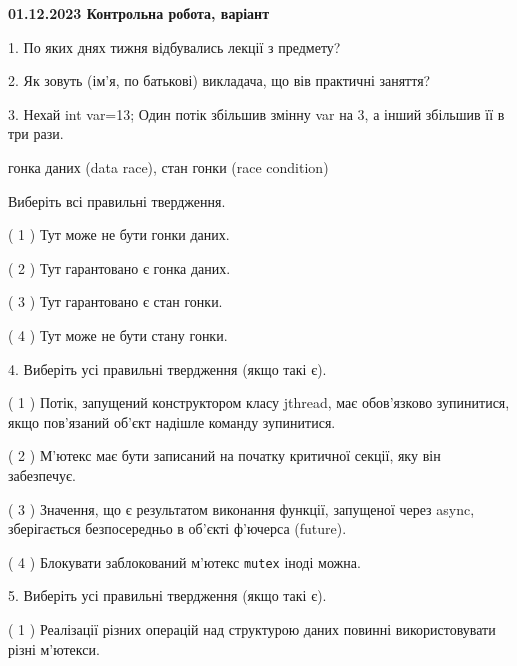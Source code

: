 \documentclass[12pt, ukrainian]{article}
\def\code#1{\Verb!#1!}
\begin{document}
\begin {large}

\textbf{01.12.2023 Контрольна робота, варіант  }\par


{
1. По яких днях тижня відбувались лекції з предмету?



\vspace{5mm}
2. Як зовуть (ім'я, по батькові) викладача, що вів практичні заняття?



\vspace{5mm}
3. Нехай int var=13; Один потік збільшив змінну var на 3, а інший збільшив її в три рази.

гонка даних (data race), стан гонки (race condition)

Виберіть всі правильні твердження.\par
\vspace{2mm}
( 1 ) Тут може не бути гонки даних.%

( 2 ) Тут гарантовано є гонка даних.%

( 3 ) Тут гарантовано є стан гонки.%

( 4 ) Тут може не бути стану гонки.%


\vspace{5mm}
4. Виберіть усі правильні твердження (якщо такі є).\par
\vspace{2mm}

( 1 ) Потік, запущений конструктором класу jthread, має обов’язково зупинитися, якщо пов’язаний об’єкт надішле команду зупинитися.%

( 2 ) М’ютекс має бути записаний на початку критичної секції, яку він забезпечує.%

( 3 ) Значення, що є результатом виконання функції, запущеної через async, зберігається безпосередньо в об’єкті ф’ючерса (future).%

( 4 ) Блокувати заблокований м’ютекс  \code{mutex} іноді можна.%


\vspace{5mm}
5. Виберіть усі правильні твердження (якщо такі є).\par
\vspace{2mm}

( 1 ) Реалізації різних операцій над структурою даних повинні використовувати різні м’ютекси.%

}
\end{large}
\end{document}
